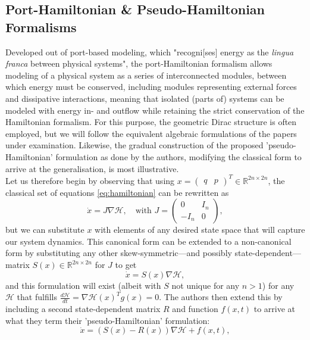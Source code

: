 \documentclass[10 pt, a4paper]{article}
\begin{document}
\subsection{Port-Hamiltonian \& Pseudo-Hamiltonian Formalisms}
Developed out of port-based modeling, which "recogni[ses] energy as the \textit{lingua franca} between physical systems"\cite{PHSysThe}, the port-Hamiltonian formalism allows modeling of a physical system as a series of interconnected modules, between which energy must be conserved, including modules representing external forces and dissipative interactions, meaning that isolated (parts of) systems can be modeled with energy in- and outflow while retaining the strict conservation of the Hamiltonian formalism. For this purpose, the geometric Dirac structure is often employed, but we will follow the equivalent algebraic formulations of the papers under examination. Likewise, the gradual construction of the proposed 'pseudo-Hamiltonian' formulation as done by the authors, modifying the classical form to arrive at the generalisation, is most illustrative.\\
Let us therefore begin by observing that using $x=\begin{pmatrix} q &p\end{pmatrix}^T \in \mathbb{R}^{2n\times 2n}$, the classical set of equations \eqref{eq:hamiltonian} can be rewritten as \[ \dot{x} = J \nabla\mathcal{H},\quad \text{with } J = \begin{pmatrix} 0 & I_n \\ -I_n & 0 \end{pmatrix}, \] but we can substitute $x$ with elements of any desired state space that will capture our system dynamics. This canonical form can be extended to a non-canonical form by substituting any other skew-symmetric—and possibly state-dependent—matrix $S(x)\in\mathbb{R}^{2n\times 2n}$ for $J$ to get \[ \dot{x} = S(x) \nabla\mathcal{H}, \] and this formulation will exist (albeit with $S$ not unique for any $n>1$) for any $\mathcal{H}$ that fulfills \(\frac{d\mathcal{H}}{dt} = \nabla\mathcal{H}(x)^T g(x) = 0\). The authors then extend this by including a second state-dependent matrix $R$ and function $f(x,t)$ to arrive at what they term their 'pseudo-Hamiltonian' formulation: \begin{equation}\label{eq:phamiltonian}
	\dot{x} = (S(x)-R(x))\nabla\mathcal{H} + f(x,t),
\end{equation}
\end{document}

